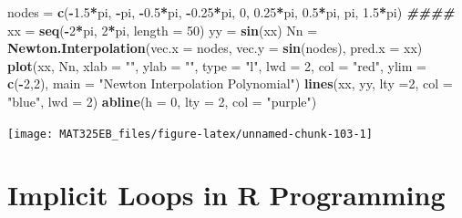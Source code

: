 \documentclass[
]{book}
\newenvironment{Shaded}{\begin{snugshade}}{\end{snugshade}}
\newcommand{\AttributeTok}[1]{\textcolor[rgb]{0.13,0.29,0.53}{#1}}
\newcommand{\DecValTok}[1]{\textcolor[rgb]{0.00,0.00,0.81}{#1}}
\newcommand{\DocumentationTok}[1]{\textcolor[rgb]{0.56,0.35,0.01}{\textbf{\textit{#1}}}}
\newcommand{\FloatTok}[1]{\textcolor[rgb]{0.00,0.00,0.81}{#1}}
\newcommand{\FunctionTok}[1]{\textcolor[rgb]{0.13,0.29,0.53}{\textbf{#1}}}
\newcommand{\NormalTok}[1]{#1}
\newcommand{\OtherTok}[1]{\textcolor[rgb]{0.56,0.35,0.01}{#1}}
\newcommand{\SpecialCharTok}[1]{\textcolor[rgb]{0.81,0.36,0.00}{\textbf{#1}}}
\newcommand{\StringTok}[1]{\textcolor[rgb]{0.31,0.60,0.02}{#1}}
\begin{document}
\begin{Shaded}
\begin{Highlighting}[]
\NormalTok{nodes }\OtherTok{=} \FunctionTok{c}\NormalTok{(}\SpecialCharTok{{-}}\FloatTok{1.5}\SpecialCharTok{*}\NormalTok{pi, }\SpecialCharTok{{-}}\NormalTok{pi, }\SpecialCharTok{{-}}\FloatTok{0.5}\SpecialCharTok{*}\NormalTok{pi, }\SpecialCharTok{{-}}\FloatTok{0.25}\SpecialCharTok{*}\NormalTok{pi, }\DecValTok{0}\NormalTok{, }\FloatTok{0.25}\SpecialCharTok{*}\NormalTok{pi, }\FloatTok{0.5}\SpecialCharTok{*}\NormalTok{pi,  pi, }\FloatTok{1.5}\SpecialCharTok{*}\NormalTok{pi)}
\DocumentationTok{\#\#\#\#}
\NormalTok{xx }\OtherTok{=} \FunctionTok{seq}\NormalTok{(}\SpecialCharTok{{-}}\DecValTok{2}\SpecialCharTok{*}\NormalTok{pi, }\DecValTok{2}\SpecialCharTok{*}\NormalTok{pi, }\AttributeTok{length =} \DecValTok{50}\NormalTok{)}
\NormalTok{yy }\OtherTok{=} \FunctionTok{sin}\NormalTok{(xx)}
\NormalTok{Nn }\OtherTok{=} \FunctionTok{Newton.Interpolation}\NormalTok{(}\AttributeTok{vec.x =}\NormalTok{ nodes,           }
                    \AttributeTok{vec.y =} \FunctionTok{sin}\NormalTok{(nodes), }
                    \AttributeTok{pred.x =}\NormalTok{ xx)}
\FunctionTok{plot}\NormalTok{(xx, Nn, }\AttributeTok{xlab =} \StringTok{""}\NormalTok{, }\AttributeTok{ylab =} \StringTok{""}\NormalTok{, }\AttributeTok{type =} \StringTok{"l"}\NormalTok{, }\AttributeTok{lwd =} \DecValTok{2}\NormalTok{, }\AttributeTok{col =} \StringTok{"red"}\NormalTok{, }\AttributeTok{ylim =} \FunctionTok{c}\NormalTok{(}\SpecialCharTok{{-}}\DecValTok{2}\NormalTok{,}\DecValTok{2}\NormalTok{), }
         \AttributeTok{main =} \StringTok{"Newton Interpolation Polynomial"}\NormalTok{)}
\FunctionTok{lines}\NormalTok{(xx, yy, }\AttributeTok{lty =}\DecValTok{2}\NormalTok{, }\AttributeTok{col =} \StringTok{"blue"}\NormalTok{, }\AttributeTok{lwd =} \DecValTok{2}\NormalTok{)}
\FunctionTok{abline}\NormalTok{(}\AttributeTok{h =} \DecValTok{0}\NormalTok{, }\AttributeTok{lty =} \DecValTok{2}\NormalTok{, }\AttributeTok{col =} \StringTok{"purple"}\NormalTok{)}
\end{Highlighting}
\end{Shaded}

\begin{center}\texttt{[image: MAT325EB\_files/figure-latex/unnamed-chunk-103-1]} \end{center}

\hypertarget{implicit-loops-in-r-programming}{%
\section{Implicit Loops in R Programming}\label{implicit-loops-in-r-programming}}
\end{document}
